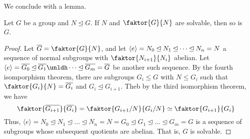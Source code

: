 We conclude with a lemma.

\begin{lemma}\label{lemma_3.5.6}
  Let $G$ be a group and  $N \unlhd G$. If  $N$ and  $\faktor{G}{N}$ are
  solvable, then so is $G$.
\end{lemma}
\begin{proof}
  Let $\bar{G}=\faktor{G}{N}$, and let $\langle e\rangle=N_0 \unlhd N_1 \unlhd \dots
  \unlhd N_n=N$ a sequence of normal subgroups with $\faktor{N_{i+1}}{N_i}$
  abelian. Let $\langle e \rangle=\bar{G_0} \unlhd \bar{G_1} \unldh \dots \unlhd
  \bar{G_m}=\bar{G}$ be another such sequence. By the fourth isomporphism
  theorem, there are subgroups $G_i \leq G$ with  $N \leq G_i$ such that
  $\faktor{G_i}{N}=\bar{G_i}$ and $G_i \unlhd G_{i+1}$. Theb by the third
  isomorphism theorem, we have
  \begin{equation*}
    \faktor{\bar{G_{i+1}}}{\bar{G_i}}=\faktor{G_{i+1}/N}{G_i/N} \simeq
    \faktor{G_{i+1}}{G_i}
  \end{equation*}
  Thus, $\langle e \rangle=N_0 \unlhd N_1 \unlhd \dots \unlhd N_n=N=G_0 \unlhd G_1
  \unlhd \dots \unlhd G_m=G$ is a sequence of subgroups whose subsequent
  quotients are abelian. That is, $G$ is solvable.
\end{proof}
